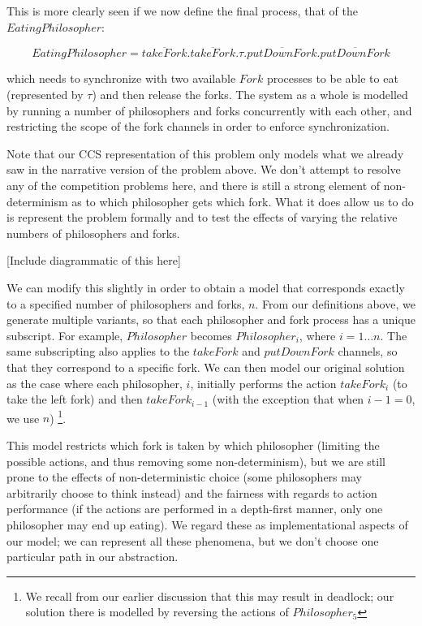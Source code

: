 This is more clearly seen if we now define the final process, that of
the $EatingPhilosopher$:

\begin{equation}
EatingPhilosopher = \overline{takeFork}.\overline{takeFork}.\tau.\overline{putDownFork}.\overline{putDownFork}
\end{equation}

\noindent which needs to synchronize with two available $Fork$ processes
to be able to eat (represented by $\tau$) and then release the forks.
The system as a whole is modelled by running a number of philosophers
and forks concurrently with each other, and restricting the scope of the
fork channels in order to enforce synchronization.

Note that our CCS representation of this problem only models what we
already saw in the narrative version of the problem above.  We don't
attempt to resolve any of the competition problems here, and there is
still a strong element of non-determinism as to which philosopher gets
which fork.  What it does allow us to do is represent the problem
formally and to test the effects of varying the relative numbers of
philosophers and forks.

[Include diagrammatic of this here]

We can modify this slightly in order to obtain a model that corresponds
exactly to a specified number of philosophers and forks, $n$.  From our
definitions above, we generate multiple variants, so that each
philosopher and fork process has a unique subscript.  For example,
$Philosopher$ becomes $Philosopher_i$, where $i = 1\dots n$.  The same
subscripting also applies to the $takeFork$ and $putDownFork$ channels,
so that they correspond to a specific fork.  We can then model our
original solution as the case where each philosopher, $i$, initially
performs the action $takeFork_i$ (to take the left fork) and then
$takeFork_{i-1}$ (with the exception that when $i-1 = 0$, we use $n$)
\footnote{We recall from our earlier discussion that this may result in
deadlock; our solution there is modelled by reversing the actions of
$Philosopher_5$}.

This model restricts which fork is taken by which philosopher (limiting
the possible actions, and thus removing some non-determinism), but we
are still prone to the effects of non-deterministic choice (some
philosophers may arbitrarily choose to think instead) and the fairness
with regards to action performance (if the actions are performed in a
depth-first manner, only one philosopher may end up eating).  We regard
these as implementational aspects of our model; we can represent all
these phenomena, but we don't choose one particular path in our
abstraction.

